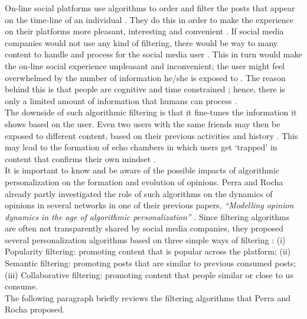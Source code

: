 \documentclass[11 pt , letterpaper , twoside , openright]{book}
\begin{document}
On-line social platforms use algorithms to order and filter the posts that appear on the time-line of an individual \cite{Perra2019}. They do this in order to make the experience on their platforms more pleasant, interesting and convenient \cite{Perra2019}. If social media companies would not use any kind of filtering, there would be way to many content to handle and process for the social media user \cite{Bozdag2013}. This in turn would make the on-line social experience unpleasant and inconvenient; the user might feel overwhelmed by the number of information he/she is exposed to \cite{Bozdag2013}. The reason behind this is that people are cognitive and time constrained \cite{Perra2019}; hence, there is only a limited amount of information that humans can process \cite{Bozdag2013}.\\
\newline
The downside of such algorithmic filtering is that it fine-tunes the information it shows based on the user. Even two users with the same friends may then be exposed to different content, based on their previous activities and history \cite{Bozdag2013}. This may lead to the formation of echo chambers in which users get `trapped' in content that confirms their own mindset \cite{Bozdag2013}. \\
\newline
It is important to know and be aware of the possible impacts of algorithmic personalization on the formation and evolution of opinions. Perra and Rocha already partly investigated the role of such algorithms on the dynamics of opinions in several networks in one of their previous papers, \textit{``Modelling opinion dynamics in the age of algorithmic personalization''} \cite{Perra2019}. Since filtering algorithms are often not transparently shared by social media companies, they proposed several personalization algorithms based on three simple ways of filtering \cite{Perra2019}: (i) Popularity filtering: promoting content that is popular across the platform; (ii) Semantic filtering: promoting posts that are similar to previous consumed posts; (iii) Collaborative filtering: promoting content that people similar or close to us consume.\\ 
\newline
The following paragraph briefly reviews the filtering algorithms that Perra and Rocha proposed. \\
\newline
\end{document}
